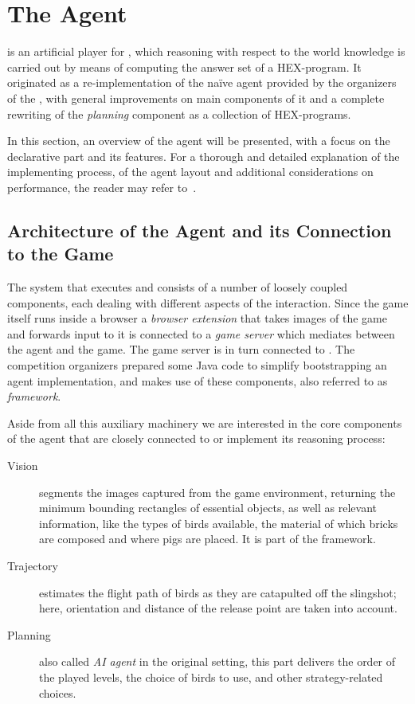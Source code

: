 \section{The \ah Agent}
\label{sec:agent}
\ah is an artificial player for \ab,
which reasoning with respect to
the world knowledge is carried out by
means of computing the answer set of a
HEX-program.
It originated as a re-implementation of
the na\"{i}ve agent provided by the organizers
of the \abc \cite{angryAI},
with general improvements on main components
of it and a complete rewriting of the
\emph{planning} component as a collection
of HEX-programs.

In this section, an overview of the \ah
agent will be presented, with a focus on
the declarative part and its features. 
For a thorough and detailed explanation of
the implementing process, of the agent
layout and additional considerations on
performance, the reader may refer to~\cite{angryhex}.

\subsection{Architecture of the Agent and its Connection to the Game}
\label{sec:agent_base}

The system that executes \ah and \ab consists of a
number of loosely coupled components,
each dealing with different aspects of the interaction.
Since the game itself runs inside a browser a
\emph{browser extension} that takes images of the game
and forwards input to it is connected to a \emph{game server}
which mediates between the agent and the game. The game server
is in turn connected to \ah.
The competition organizers prepared some Java code to
simplify bootstrapping an agent implementation, and \ah
makes use of these components, also referred to as \emph{framework}.

Aside from all this auxiliary machinery we are interested in
the core components of the agent that are closely connected to
or implement its reasoning process:
\begin{description}
    \item[Vision] segments the images
    captured from the game environment, returning
    the minimum bounding rectangles of essential
    objects, as well as relevant information,
    like the types of birds available, the material
    of which bricks are composed and where pigs are placed.
    It is part of the framework.
    \item[Trajectory] estimates
    the flight path of birds as they are
    catapulted off the slingshot; here, orientation and distance of
    the release point are taken into account.
    \item[Planning] also called \emph{AI agent} in the
    original setting, this part delivers the order
    of the played levels, the choice of birds to use,
    and other strategy-related choices.
\end{description}

